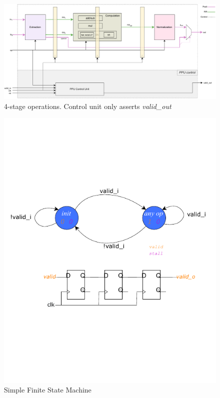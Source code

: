 \begin{figure}
    \centering
    \includegraphics[width=1\textwidth]{figures/ppu_all_with_control_unit_3b.pdf}
        \caption{4-stage operations. Control unit only asserts \textit{valid\_out}}
        \label{fig:ppu_with_control_unit2}
\end{figure}%

\begin{figure}
    \centering
    \includegraphics[width=1\textwidth]{figures/simple_fsm.pdf}
    \caption{Simple Finite State Machine}
    \label{fig:simple_fsm}
\end{figure}




